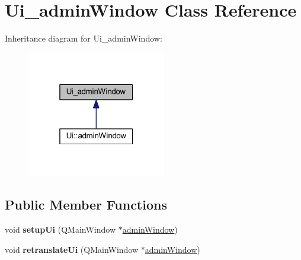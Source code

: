 \hypertarget{class_ui__admin_window}{}\section{Ui\+\_\+admin\+Window Class Reference}
\label{class_ui__admin_window}


Inheritance diagram for Ui\+\_\+admin\+Window\+:
\nopagebreak
\begin{figure}[H]
\begin{center}
\leavevmode
\includegraphics[width=172pt]{class_ui__admin_window__inherit__graph}
\end{center}
\end{figure}
\subsection*{Public Member Functions}
\begin{DoxyCompactItemize}
\item 
\mbox{\label{class_ui__admin_window_a7057c6fc6718b89da0d1ef1e8feb5e62}} 
void {\bfseries setup\+Ui} (Q\+Main\+Window $\ast$\hyperlink{classadmin_window}{admin\+Window})
\item 
\mbox{\label{class_ui__admin_window_ac7535c816a61f0c9b55d8d8fbe774130}} 
void {\bfseries retranslate\+Ui} (Q\+Main\+Window $\ast$\hyperlink{classadmin_window}{admin\+Window})
\end{DoxyCompactItemize}
